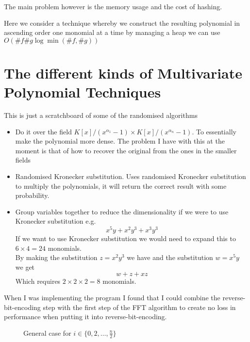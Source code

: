 The main problem however is the memory usage and the cost of hashing.

Here we consider a technique whereby we construct the resulting polynomial in ascending order one monomial at a time by managing a heap we can use $O(\#f \#g \log \min(\# f, \# g))$


\section{The different kinds of Multivariate Polynomial Techniques}

This is just a scratchboard of some of the randomised algorithms

\begin{itemize}
    \item Do it over the field $K[x]/(x^{\alpha_1} -1) \times K[x]/(x^{\alpha_n} -1)$. To essentially make the polynomial more dense. The problem I have with this at the moment is that of how to recover the original from the ones in the smaller fields
    \item Randomised Kronecker substitution. Uses randomised Kronecker substitution to multiply the polynomials, it will return the correct result with some probability.
    \item Group variables together to reduce the dimensionality if we were to use Kronecker substitution e.g.
        \[
            x^5y + x^2y^3 + x^3y^3
        \]
        If we want to use Kronecker substitution we would need to expand this to $6 \times 4 = 24$ monomials.\\
        By making the substitution $z = x^2y^3$ we have and the substitution $w = x^5y$ we get
        \[
            w + z + xz
        \]
        Which requires $2 \times 2 \times 2 = 8$ monomials.

\end{itemize}

When I was implementing the program I found that I could combine the reverse-bit-encoding step with the first step of the FFT algorithm to create no loss in performance when putting it into reverse-bit-encoding.
\begin{figure}
    \centering
    \caption{General case for $i \in \{0, 2, \ldots, \frac{n}{2}\}$}
\end{figure}

